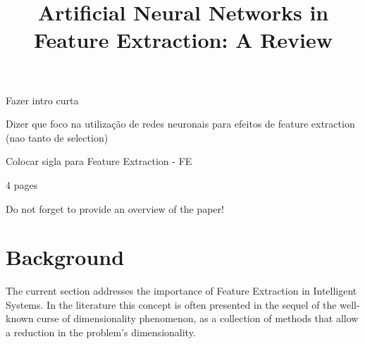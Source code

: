 \documentclass[9pt,journal,compsoc]{IEEEtran}
\begin{document}
\title{\huge Artificial Neural Networks in Feature Extraction: A Review}

\author{
	
}





\maketitle
\IEEEdisplaynontitleabstractindextext
\IEEEpeerreviewmaketitle




Fazer intro curta

Dizer que foco na utilização de redes neuronais para efeitos de feature extraction (nao tanto de selection)

Colocar sigla para Feature Extraction - FE

4 pages

Do not forget to provide an overview of the paper!

\section{Background}\label{sec:background}

The current section addresses the importance of Feature Extraction in Intelligent Systems. In the literature this concept is often presented in the sequel of the well-known curse of dimensionality phenomenon, as a collection of methods that allow a reduction in the problem's dimensionality.
\end{document}
